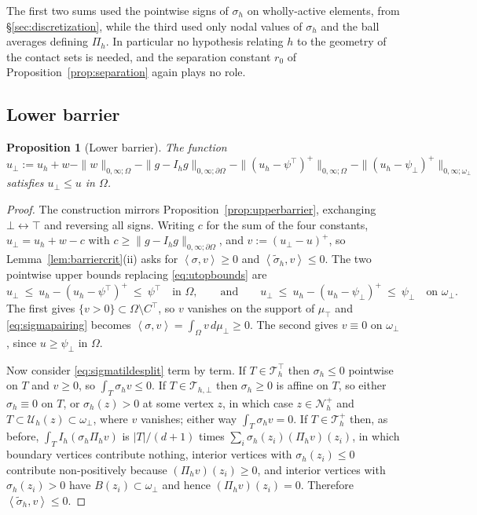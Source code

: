 \documentclass[12pt]{amsart}
\newtheorem{proposition}{Proposition}
\theoremstyle{definition}
\newcommand{\Om}{\Omega}
\newcommand{\dOm}{\partial\Omega}
\newcommand{\psilo}{\psi_\bot}
\newcommand{\psiup}{\psi^\top}
\newcommand{\Ctop}{C^\top}
\newcommand{\Th}{\mathcal{T}_h}
\newcommand{\Nh}{\mathcal{N}_h}
\newcommand{\Ih}{I_h}
\newcommand{\Pih}{\Pi_h}
\newcommand{\Uh}{\mathcal{U}_h}
\newcommand{\Thbot}{\mathcal{T}_{h,\bot}}
\newcommand{\Thtop}{\Th^\top}
\newcommand{\Thplus}{\Th^+}
\newcommand{\ombot}{\omega_\bot}
\begin{document}
The first two sums used the pointwise signs of $\sigma_h$ on wholly-active elements, from \S\ref{sec:discretization}, while the third used only nodal values of $\sigma_h$ and the ball averages defining $\Pih$.  In particular no hypothesis relating $h$ to the geometry of the contact sets is needed, and the separation constant $r_0$ of Proposition~\ref{prop:separation} again plays no role.


\subsection{Lower barrier}

\begin{proposition}[Lower barrier]
\label{prop:lowerbarrier}
The function
\begin{equation}
\label{eq:ubarlower}
  u_\bot := u_h + w - \|w\|_{0,\infty;\Om} - \|g-\Ih g\|_{0,\infty;\dOm} - \|(u_h-\psiup)^+\|_{0,\infty;\Om} - \|(u_h-\psilo)^+\|_{0,\infty;\ombot}
\end{equation}
satisfies $u_\bot \le u$ in $\Om$.
\end{proposition}

\begin{proof}
The construction mirrors Proposition~\ref{prop:upperbarrier}, exchanging $\bot \leftrightarrow \top$ and reversing all signs.  Writing $c$ for the sum of the four constants, $u_\bot = u_h + w - c$ with $c \ge \|g-\Ih g\|_{0,\infty;\dOm}$, and $v := (u_\bot - u)^+$, so Lemma~\ref{lem:barriercrit}(ii) asks for $\left<\sigma,v\right> \ge 0$ and $\left<\tilde\sigma_h,v\right> \le 0$.  The two pointwise upper bounds replacing \eqref{eq:utopbounds} are
\[
  u_\bot \ \le\ u_h - (u_h - \psiup)^+ \ \le\ \psiup \quad\text{in } \Om,
  \qquad\text{and}\qquad
  u_\bot \ \le\ u_h - (u_h - \psilo)^+ \ \le\ \psilo \quad\text{on } \ombot.
\]
The first gives $\{v>0\} \subset \Om \setminus \Ctop$, so $v$ vanishes on the support of $\mu_\top$ and \eqref{eq:sigmapairing} becomes $\left<\sigma,v\right> = \int_\Om v \,d\mu_\bot \ge 0$.  The second gives $v \equiv 0$ on $\ombot$, since $u \ge \psilo$ in $\Om$.

Now consider \eqref{eq:sigmatildesplit} term by term.  If $T \in \Thtop$ then $\sigma_h \le 0$ pointwise on $T$ and $v \ge 0$, so $\int_T \sigma_h v \le 0$.  If $T \in \Thbot$ then $\sigma_h \ge 0$ is affine on $T$, so either $\sigma_h \equiv 0$ on $T$, or $\sigma_h(z) > 0$ at some vertex $z$, in which case $z \in \Nh^+$ and $T \subset \Uh(z) \subset \ombot$, where $v$ vanishes; either way $\int_T\sigma_h v = 0$.  If $T \in \Thplus$ then, as before, $\int_T \Ih(\sigma_h\Pih v)$ is $|T|/(d+1)$ times $\sum_i \sigma_h(z_i)(\Pih v)(z_i)$, in which boundary vertices contribute nothing, interior vertices with $\sigma_h(z_i) \le 0$ contribute non-positively because $(\Pih v)(z_i) \ge 0$, and interior vertices with $\sigma_h(z_i) > 0$ have $B(z_i) \subset \ombot$ and hence $(\Pih v)(z_i) = 0$.  Therefore $\left<\tilde\sigma_h,v\right> \le 0$.
\end{proof}
\end{document}
